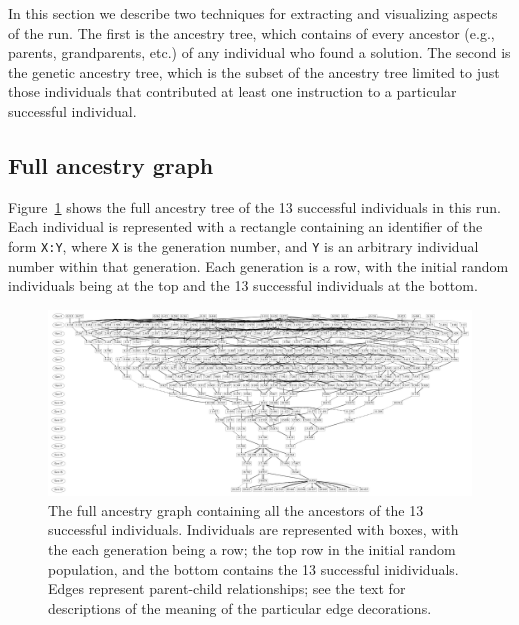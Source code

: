 \documentclass[graybox]{svmult}
\begin{document}
In this section we describe two techniques for extracting and 
visualizing aspects of the run. The first is the ancestry tree, which 
contains of every ancestor (e.g., parents, grandparents, etc.) of any
individual who found a solution. The second is the genetic ancestry 
tree, which is the subset of the ancestry tree limited to just those 
individuals that contributed at least one instruction to a particular
successful individual.

\subsection{Full ancestry graph}

Figure~\ref{fig:run0Labelled} shows the full ancestry tree of the 13 successful 
individuals in this run. Each individual is represented with a
rectangle containing an identifier of the form \texttt{X:Y}, where \texttt{X}
is the generation number, and \texttt{Y} is an arbitrary individual number
within that generation. Each generation is a row, with the initial random
individuals being at the top and the 13 successful individuals at the bottom.

\begin{figure} %
	\begin{center}
		\vspace{0.6\columnwidth}
		\includegraphics[width=\columnwidth]{../figures/run0_GPTP_2_font_30}
	\end{center}
	\caption{The full ancestry graph containing all the ancestors of the 13
		successful individuals. Individuals are represented with boxes, with the each generation being a row; the top row in the initial random
		population, and the bottom contains the 13 successful inidividuals.
		Edges represent parent-child relationships; see the text for 
		descriptions of the meaning of the particular edge decorations.}
	\label{fig:run0Labelled}       %
\end{figure}
\end{document}
